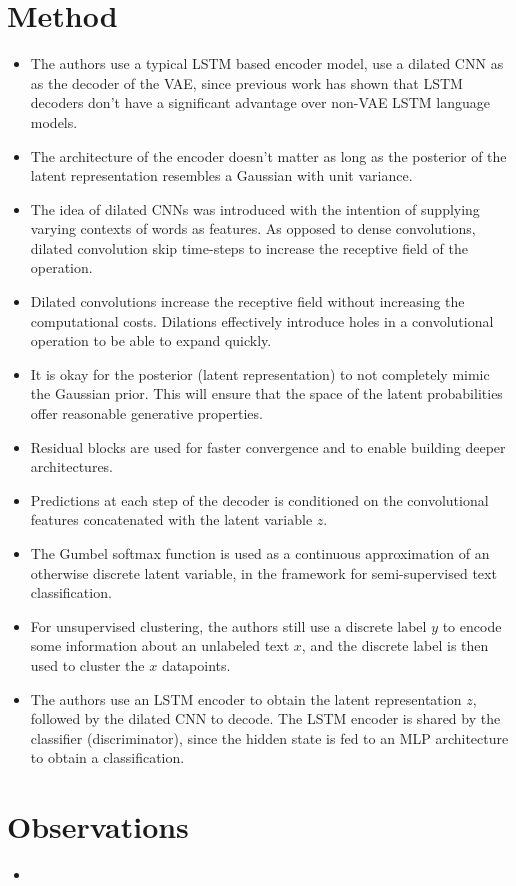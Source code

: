 \documentclass[12pt]{scrartcl}
\begin{document}
\section{Method}
  \begin{itemize}
    \item The authors use a typical LSTM based encoder model, use a dilated CNN as as the decoder of the VAE, since previous work has shown that LSTM decoders don't have a significant advantage over non-VAE LSTM language models.
    \item The architecture of the encoder doesn't matter as long as the posterior of the latent representation resembles a Gaussian with unit variance.
    \item The idea of dilated CNNs was introduced with the intention of supplying varying contexts of words as features. As opposed to dense convolutions, dilated convolution skip time-steps to increase the receptive field of the operation.
    \item Dilated convolutions increase the receptive field without increasing the computational costs. Dilations effectively introduce holes in a convolutional operation to be able to expand quickly.
    \item It is okay for the posterior (latent representation) to not completely mimic the Gaussian prior. This will ensure that the space of the latent probabilities offer reasonable generative properties.
    \item Residual blocks are used for faster convergence and to enable building deeper architectures.
    \item Predictions at each step of the decoder is conditioned on the convolutional features concatenated with the latent variable $z$.
    \item The Gumbel softmax function is used as a continuous approximation of an otherwise discrete latent variable, in the framework for semi-supervised text classification.
    \item For unsupervised clustering, the authors still use a discrete label $y$ to encode some information about an unlabeled text $x$, and the discrete label is then used to cluster the $x$ datapoints.
    \item The authors use an LSTM encoder to obtain the latent representation $z$, followed by the dilated CNN to decode. The LSTM encoder is shared by the classifier (discriminator), since the hidden state is fed to an MLP architecture to obtain a classification.
  \end{itemize}

\section{Observations}
  \begin{itemize}
    \item 
  \end{itemize}



\end{document}
